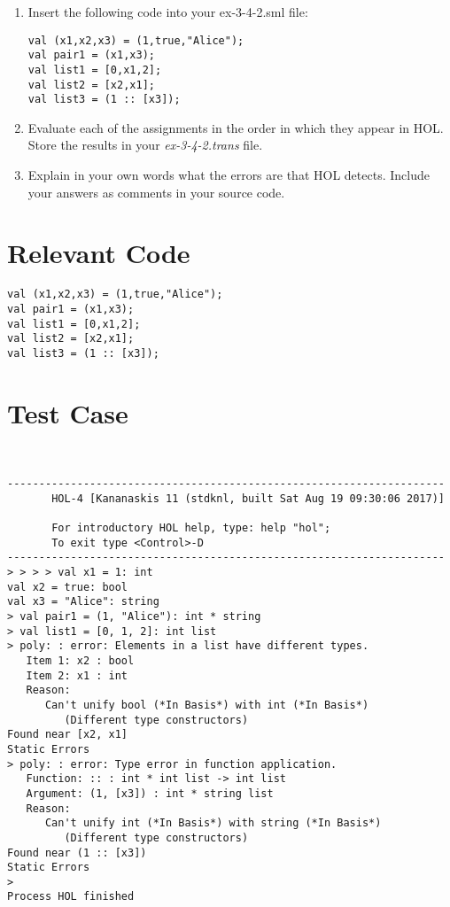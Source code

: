 \documentclass{report}
\begin{document}
\begin{enumerate}
	\item Insert the following code into your ex-3-4-2.sml file:
	\begin{lstlisting}[frame=shadowbox]
val (x1,x2,x3) = (1,true,"Alice");
val pair1 = (x1,x3);
val list1 = [0,x1,2];
val list2 = [x2,x1];
val list3 = (1 :: [x3]);
	\end{lstlisting}
	\item Evaluate each of the assignments in the order in which they appear in HOL. Store the results in your \emph{ex-3-4-2.trans} file.
	\item Explain in your own words what the errors are that HOL detects. Include your answers as comments in your source code.
\end{enumerate}

\section{Relevant Code}
\label{rel-code-3-4-2}
\begin{lstlisting}[frame=TB]
val (x1,x2,x3) = (1,true,"Alice");
val pair1 = (x1,x3);
val list1 = [0,x1,2];
val list2 = [x2,x1];
val list3 = (1 :: [x3]);
\end{lstlisting}

\section{Test Case}
\label{test-results-3-4-2}
\begin{session}
  \begin{scriptsize}
\begin{verbatim}


---------------------------------------------------------------------
       HOL-4 [Kananaskis 11 (stdknl, built Sat Aug 19 09:30:06 2017)]

       For introductory HOL help, type: help "hol";
       To exit type <Control>-D
---------------------------------------------------------------------
> > > > val x1 = 1: int
val x2 = true: bool
val x3 = "Alice": string
> val pair1 = (1, "Alice"): int * string
> val list1 = [0, 1, 2]: int list
> poly: : error: Elements in a list have different types.
   Item 1: x2 : bool
   Item 2: x1 : int
   Reason:
      Can't unify bool (*In Basis*) with int (*In Basis*)
         (Different type constructors)
Found near [x2, x1]
Static Errors
> poly: : error: Type error in function application.
   Function: :: : int * int list -> int list
   Argument: (1, [x3]) : int * string list
   Reason:
      Can't unify int (*In Basis*) with string (*In Basis*)
         (Different type constructors)
Found near (1 :: [x3])
Static Errors
> 
Process HOL finished

\end{verbatim}
  \end{scriptsize}
\end{session}
\end{document}
